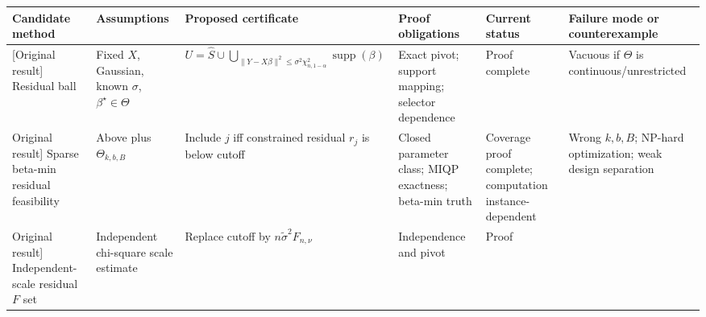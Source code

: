 \documentclass[
  english,
  11pt,
  a4paper,
]{article}
\newcounter{none} %
\begin{document}
{\def\LTcaptype{none} %
\begin{landscape}
\scriptsize
\begin{longtable}[]{@{}
  >{\raggedright\arraybackslash}p{}
  >{\raggedright\arraybackslash}p{}
  >{\raggedright\arraybackslash}p{}
  >{\raggedright\arraybackslash}p{}
  >{\raggedright\arraybackslash}p{}
  >{\raggedright\arraybackslash}p{}@{}}
\toprule\noalign{}
\begin{minipage}[b]{\linewidth}\raggedright
Candidate method
\end{minipage} & \begin{minipage}[b]{\linewidth}\raggedright
Assumptions
\end{minipage} & \begin{minipage}[b]{\linewidth}\raggedright
Proposed certificate
\end{minipage} & \begin{minipage}[b]{\linewidth}\raggedright
Proof obligations
\end{minipage} & \begin{minipage}[b]{\linewidth}\raggedright
Current status
\end{minipage} & \begin{minipage}[b]{\linewidth}\raggedright
Failure mode or counterexample
\end{minipage} \\
\midrule\noalign{}
\endhead
\bottomrule\noalign{}
\endlastfoot
{[}Original result{]} Residual ball & Fixed $X$, Gaussian, known
$\sigma$, $\beta^\star\in\Theta$ &
$U=\widehat S\cup\bigcup_{\|Y-X\beta\|^2\le\sigma^2\chi^2_{n,1-\alpha}}\operatorname{supp}(\beta)$
& Exact pivot; support mapping; selector dependence & Proof complete &
Vacuous if $\Theta$ is continuous/unrestricted \\
{[}Original result{]} Sparse beta-min residual feasibility & Above plus
$\Theta_{k,b,B}$ & Include $j$ iff constrained residual $r_j$ is
below cutoff & Closed parameter class; MIQP exactness; beta-min truth &
Coverage proof complete; computation instance-dependent & Wrong
$k,b,B$; NP-hard optimization; weak design separation \\
{[}Original result{]} Independent-scale residual $F$ set & Independent
chi-square scale estimate & Replace cutoff by
$n\widetilde\sigma^2F_{n,\nu}$ & Independence and pivot & Proof

\end{longtable}
\end{landscape}}
\end{document}
